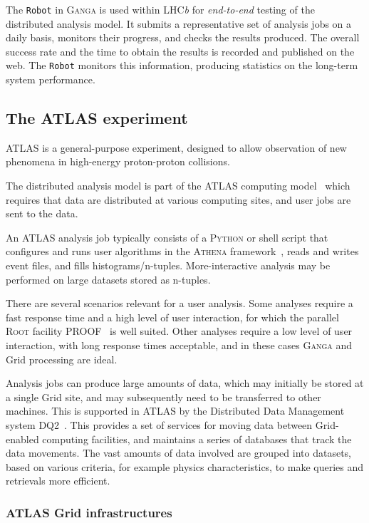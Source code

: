 \documentclass{elsart}
\def\lhcb {LHC{\em b\/}\xspace}
\def\atlas {ATLAS\xspace}
\def\ganga {\textsc{Ganga}\xspace}
\def\python {\textsc{Python}\xspace}
\def\root {\textsc{Root}\xspace}
\def\athena {\textsc{Athena}\xspace}
\def\grid {Grid\xspace}
\newcommand{\code}[1]{\texttt{#1}}
\begin{document}
\begin{linenumbers}
The \code{Robot} in \ganga is used within \lhcb for \emph{end-to-end} testing
of the distributed analysis model. It submits a representative set of
analysis jobs on a daily basis, monitors their progress, and checks 
the results produced. The overall success rate and the time to obtain
the results is recorded and published on the web. The
\code{Robot} monitors this information, producing statistics on the
long-term system performance.

\subsection{The \atlas experiment}
\label{sec:atlas}

\atlas is a general-purpose experiment, designed to allow observation of new
phenomena in high-energy proton-proton collisions.

The distributed analysis model is part of the \atlas computing
model~\cite{bib:atlascompmod} which requires that data are distributed at
various computing sites, and user jobs are sent to the data.

An \atlas analysis job typically consists of a \python
or shell script that configures and runs user algorithms in the \athena
framework~\cite{bib:atlascompmod}, reads and writes event files, and
fills histograms/n-tuples. More-interactive analysis may be performed on
large datasets stored as n-tuples.

There are several scenarios relevant for a user analysis.  Some analyses require
a fast response time and a high level of user interaction, for which the
parallel \root facility PROOF~\cite{ballintijn_2006} is well suited.  Other
analyses require a low level of user interaction, with long response times
acceptable, and in these cases \ganga and \grid processing are ideal.

Analysis jobs can produce large amounts of data, which may initially be
stored at a single \grid site, and may subsequently need to be transferred
to other machines.  This is supported in \atlas by the Distributed Data
Management system DQ2~\cite{bib:atlasdq2}.  This provides
a set of services for moving data between \grid-enabled computing facilities,
and maintains a series of databases that track the data movements.  The
vast amounts of data involved are grouped into datasets, based on various
criteria, for example physics characteristics, to make queries and retrievals
more efficient.

\subsubsection{\atlas \grid infrastructures}


\end{linenumbers}
\end{document}
